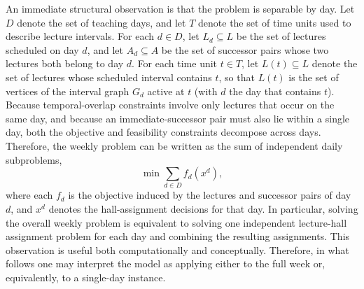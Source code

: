 \documentclass[11pt]{article}
\begin{document}
An immediate structural observation is that the problem is separable by day. Let $D$ denote the set of teaching days, and let $T$ denote the set of time units used to describe lecture intervals. For each $d \in D$, let $L_d \subseteq L$ be the set of lectures scheduled on day $d$, and let $A_d \subseteq A$ be the set of successor pairs whose two lectures both belong to day $d$. For each time unit $t \in T$, let $L(t) \subseteq L$ denote the set of lectures whose scheduled interval contains $t$, so that $L(t)$ is the set of vertices of the interval graph $G_d$ active at $t$ (with $d$ the day that contains $t$). Because temporal-overlap constraints involve only lectures that occur on the same day, and because an immediate-successor pair must also lie within a single day, both the objective and feasibility constraints decompose across days. Therefore, the weekly problem can be written as the sum of independent daily subproblems,
\begin{equation}
    \min \sum_{d \in D} f_d(x^d),
\end{equation}
where each $f_d$ is the objective induced by the lectures and successor pairs of day $d$, and $x^d$ denotes the hall-assignment decisions for that day. In particular, solving the overall weekly problem is equivalent to solving one independent lecture-hall assignment problem for each day and combining the resulting assignments. This observation is useful both computationally and conceptually. Therefore, in what follows one may interpret the model as applying either to the full week or, equivalently, to a single-day instance.
\end{document}
